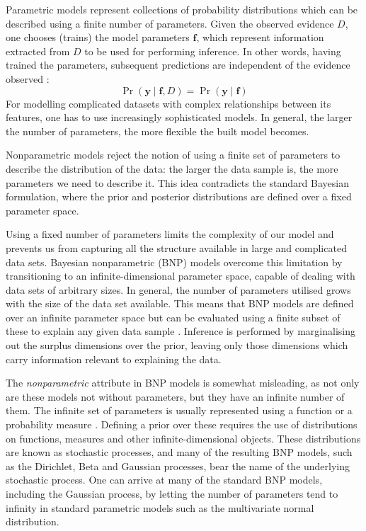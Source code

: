 \documentclass[a4paper,12pt ]{report}
\begin{document}
Parametric models represent collections of probability distributions which can be described using a finite number of parameters. Given the observed evidence $D$, one chooses (trains) the model parameters $\mathbf{f}$, which represent information extracted from $D$ to be used for performing inference. In other words, having trained the parameters, subsequent predictions are independent of the evidence observed \cite{gha12}:
\begin{equation*}	\Pr ( \mathbf{y} \mid \mathbf{f}, D ) = 	\Pr ( \mathbf{y} \mid \mathbf{f} )	\end{equation*}
For modelling complicated datasets with complex relationships between its features, one has to use increasingly sophisticated models. In general, the larger the number of parameters, the more flexible the built model becomes.

Nonparametric models reject the notion of using a finite set of parameters to describe the distribution of the data: the larger the data sample is, the more parameters we need to describe it. This idea contradicts the standard Bayesian formulation, where the prior and posterior distributions are defined over a fixed parameter space.

Using a fixed number of parameters limits the complexity of our model and prevents us from capturing all the structure available in large and complicated data sets. Bayesian nonparametric (BNP) models overcome this limitation by transitioning to an infinite-dimensional parameter space, capable of dealing with data sets of arbitrary sizes. In general, the number of parameters utilised grows with the size of the data set available. This means that BNP models are defined over an infinite parameter space but can be evaluated using a finite subset of these to explain any given data sample \cite{orbanzteh}. Inference is performed by marginalising out the surplus dimensions over the prior, leaving only those dimensions which carry information relevant to explaining the data.
    

The \emph{nonparametric} attribute in BNP models is somewhat misleading, as not only are these models not without parameters, but they have an infinite number of them. The infinite set of parameters is usually represented using a function or a probability measure \cite{orbanzteh}. Defining a prior over these requires the use of distributions on functions, measures and other infinite-dimensional objects. These distributions are known as stochastic processes, and many of the resulting BNP models, such as the Dirichlet, Beta and Gaussian processes, bear the name of the underlying stochastic process. One can arrive at many of the standard BNP models, including the Gaussian process, by letting the number of parameters tend to infinity in standard parametric models such as the multivariate normal distribution.
\end{document}
